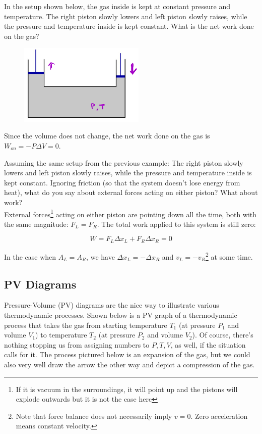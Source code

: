 \begin{texample}
	In the setup shown below, the gas inside is kept at constant pressure and temperature. The right piston slowly lowers and left piston slowly raises, while the pressure and temperature inside is kept constant. What is the net work done on the gas? 
	
	\begin{figure}[H]
		\centering
		\includegraphics[width=60mm]{24.png}
	\end{figure}
	
	Since the volume does not change, the net work done on the gas is $W_{on}=-P\Delta V=0$.
\end{texample}

\begin{texample}
	Assuming the same setup from the previous example: The right piston slowly lowers and left piston slowly raises, while the pressure and temperature inside is kept constant. Ignoring friction (so that the system doesn't lose energy from heat), what do you say about external forces acting on either piston? What about work? \\
	
	External forces\footnote{If it is vacuum in the surroundings, it will point up and the pistons will explode outwards but it is not the case here} acting on either piston are pointing down all the time, both with the same magnitude: $F_L=F_R$. The total work applied to this system is still zero:
	
	$$W=F_L\Delta x_L +F_R\Delta x_R=0$$
	
	In the case when $A_L=A_R$, we have $\Delta x_L=-\Delta x_R$ and $v_L = -v_R$\footnote{Note that force balance does not necessarily imply $v=0$. Zero acceleration means constant velocity.} at some time.
\end{texample}

\subsection{PV Diagrams}

Pressure-Volume (PV) diagrams are the nice way to illustrate various thermodynamic processes. Shown below is a PV graph of a thermodynamic process that takes the gas from starting temperature $T_1$ (at pressure $P_1$ and volume $V_1$) to temperature $T_2$ (at pressure $P_2$ and volume $V_2$). Of course, there's nothing stopping us from assigning numbers to $P,T,V$, as well, if the situation calls for it. The process pictured below is an expansion of the gas, but we could also very well draw the arrow the other way and depict a compression of the gas. 

